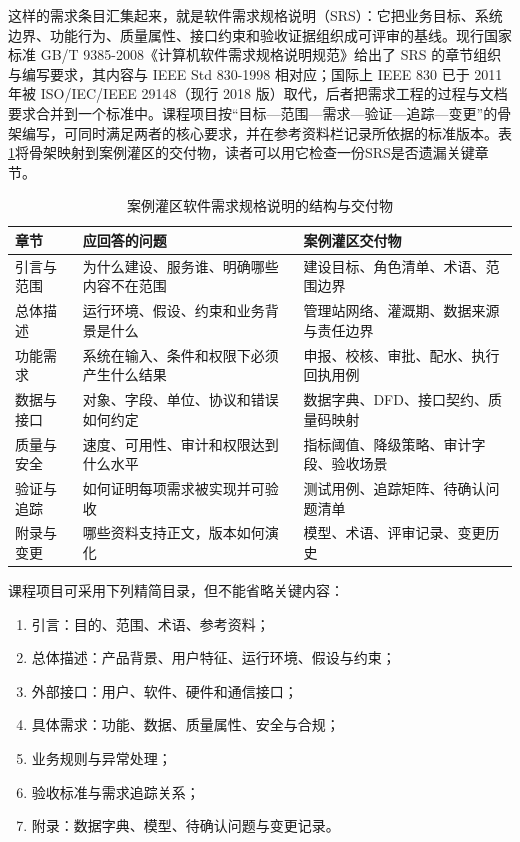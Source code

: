这样的需求条目汇集起来，就是软件需求规格说明（SRS）：它把业务目标、系统边界、功能行为、质量属性、接口约束和验收证据组织成可评审的基线。现行国家标准 GB/T 9385-2008《计算机软件需求规格说明规范》给出了 SRS 的章节组织与编写要求，其内容与 IEEE Std 830-1998 相对应\cite{gbt93852008}；国际上 IEEE 830 已于 2011 年被 ISO/IEC/IEEE 29148（现行 2018 版）取代，后者把需求工程的过程与文档要求合并到一个标准中。课程项目按“目标—范围—需求—验证—追踪—变更”的骨架编写，可同时满足两者的核心要求，并在参考资料栏记录所依据的标准版本。表\ref{tab:ch02-srs-structure}将骨架映射到案例灌区的交付物，读者可以用它检查一份SRS是否遗漏关键章节。

\begin{table}[htbp]
\centering
\caption{案例灌区软件需求规格说明的结构与交付物}
\label{tab:ch02-srs-structure}
\begin{tabular}{p{2.5cm}p{4.2cm}p{4.2cm}}
\toprule
章节 & 应回答的问题 & 案例灌区交付物 \\
\midrule
引言与范围 & 为什么建设、服务谁、明确哪些内容不在范围 & 建设目标、角色清单、术语、范围边界 \\
总体描述 & 运行环境、假设、约束和业务背景是什么 & 管理站网络、灌溉期、数据来源与责任边界 \\
功能需求 & 系统在输入、条件和权限下必须产生什么结果 & 申报、校核、审批、配水、执行回执用例 \\
数据与接口 & 对象、字段、单位、协议和错误如何约定 & 数据字典、DFD、接口契约、质量码映射 \\
质量与安全 & 速度、可用性、审计和权限达到什么水平 & 指标阈值、降级策略、审计字段、验收场景 \\
验证与追踪 & 如何证明每项需求被实现并可验收 & 测试用例、追踪矩阵、待确认问题清单 \\
附录与变更 & 哪些资料支持正文，版本如何演化 & 模型、术语、评审记录、变更历史 \\
\bottomrule
\end{tabular}
\end{table}

课程项目可采用下列精简目录，但不能省略关键内容：

\begin{enumerate}
\item 引言：目的、范围、术语、参考资料；
\item 总体描述：产品背景、用户特征、运行环境、假设与约束；
\item 外部接口：用户、软件、硬件和通信接口；
\item 具体需求：功能、数据、质量属性、安全与合规；
\item 业务规则与异常处理；
\item 验收标准与需求追踪关系；
\item 附录：数据字典、模型、待确认问题与变更记录。
\end{enumerate}

